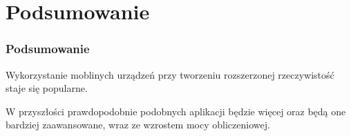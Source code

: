 \section{Podsumowanie}
\begin{frame}
    \frametitle{Podsumowanie}
    Wykorzystanie moblinych urządzeń przy tworzeniu rozszerzonej rzeczywistość staje się popularne.

    W przyszłości prawdopodobnie podobnych aplikacji będzie więcej oraz będą one bardziej zaawansowane, wraz ze wzrostem mocy obliczeniowej.
\end{frame}
